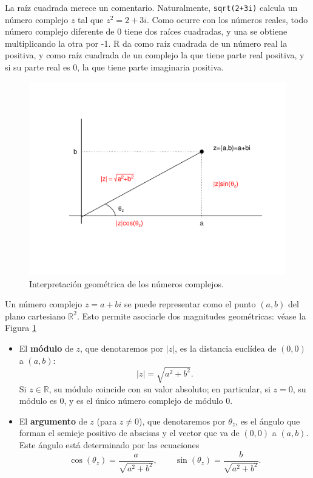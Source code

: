 \documentclass[
]{book}
\theoremstyle{definition}
\theoremstyle{definition}
\theoremstyle{definition}
\theoremstyle{remark}
\begin{document}
La raíz cuadrada merece un comentario. Naturalmente, \texttt{sqrt(2+3i)} calcula un número complejo \(z\) tal que \(z^2=2+3i\). Como ocurre con los números reales, todo número complejo diferente de 0 tiene dos raíces cuadradas, y una se obtiene multiplicando la otra por -1.
R da como raíz cuadrada de un número real la positiva, y como raíz cuadrada de un complejo la que tiene parte real positiva, y si su parte real es 0, la que tiene parte imaginaria positiva.

\begin{figure}

{\centering \includegraphics[width=0.8\linewidth]{02chap01_La_calculadora_files/figure-latex/geom-1} 

}

\caption{Interpretación geométrica de los números complejos.}\label{fig:geom}
\end{figure}

Un número complejo \(z=a+bi\) se puede representar como el punto \((a,b)\) del plano cartesiano \(\mathbb{R}^2\). Esto permite asociarle dos
magnitudes geométricas: véase la Figura \ref{fig:geom}

\begin{itemize}
\item
  El \textbf{módulo} de \(z\), que denotaremos por \(|z|\), es la distancia
  euclídea de \((0,0)\) a \((a,b)\):
  \[
  |z|=\sqrt{a^2+b^2}.
  \]
  Si \(z\in \mathbb{R}\), su módulo coincide con su valor absoluto; en particular, si \(z=0\), su módulo es \(0\), y es el único número complejo de módulo 0.
\item
  El \textbf{argumento} de \(z\) (para \(z\neq 0\)), que denotaremos por
  \(\theta_{z}\), es el ángulo que forman el semieje positivo de abscisas y el vector que va de \((0,0)\) a \((a,b)\).
  Este ángulo está determinado por las ecuaciones
  \[
  \cos (\theta_{z})=\frac{a}{\sqrt{a^2+b^2}},\qquad
  \sin (\theta_{z})=\frac{b}{\sqrt{a^2+b^2}}.
  \]
\end{itemize}
\end{document}
